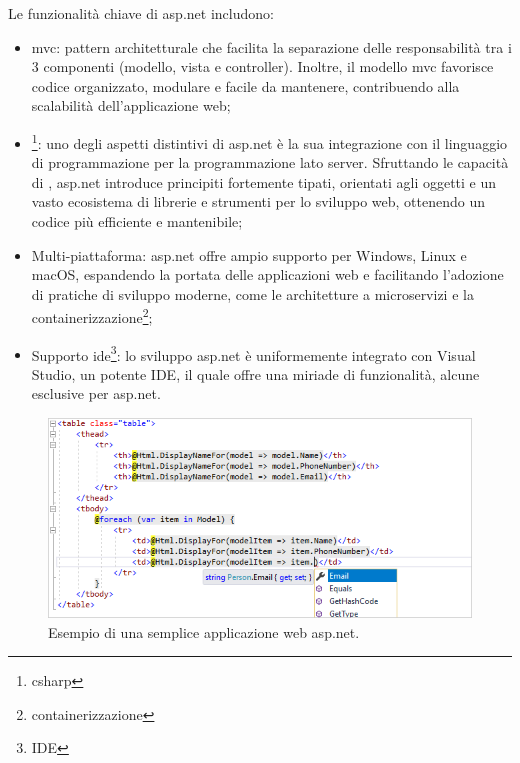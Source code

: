 Le funzionalità chiave di \acrshort{asp.net} includono:
\begin{itemize}
    \item \acrfull{mvc}: pattern architetturale che facilita la separazione delle responsabilità tra i 3 componenti (modello, vista e controller). Inoltre, il modello \acrshort{mvc} favorisce codice organizzato, modulare e facile da mantenere, contribuendo alla scalabilità dell'applicazione web;
    \item {}\footnote{\glsdesc{csharp}}: uno degli aspetti distintivi di \acrshort{asp.net} è la sua integrazione con il linguaggio di programmazione  per la programmazione lato server. Sfruttando le capacità di , \acrshort{asp.net} introduce principiti fortemente tipati, orientati agli oggetti e un vasto ecosistema di librerie e strumenti per lo sviluppo web, ottenendo un codice più efficiente e mantenibile;
    \item Multi-piattaforma: \acrshort{asp.net} offre ampio supporto per Windows, Linux e macOS, espandendo la portata delle applicazioni web e facilitando l'adozione di pratiche di sviluppo moderne, come le architetture a microservizi e la containerizzazione\footnote{\glsdesc{containerizzazione}};
    \item Supporto \acrfull{ide}\footnote{\glsdesc{IDE}}: lo sviluppo \acrshort{asp.net} è uniformemente integrato con Visual Studio, un potente \acrshort{IDE}, il quale offre una miriade di funzionalità, alcune esclusive per \acrshort{asp.net}.
\end{itemize}

\begin{figure}[H]
\centering
\includegraphics[width=1\textwidth]{Images/aspnet example (razor).png}
\caption{\label{fig:aspnet example}Esempio di una semplice applicazione web  \acrshort{asp.net}.}
\end{figure}

